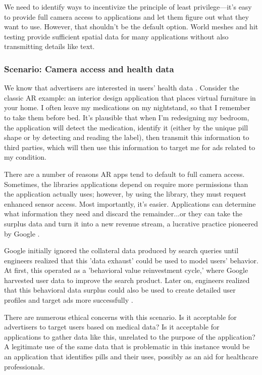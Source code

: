 We need to identify ways to incentivize the principle of least privilege---it's easy to provide full camera access to applications and let them figure out what they want to use. However, that shouldn't be the default option. World meshes and hit testing provide sufficient spatial data for many applications without also transmitting details like text.

\subsubsection{Scenario: Camera access and health data}\label{sec:data:world:camera}

We know that advertisers are interested in users' health data \cite{jeong2019insurers}. Consider the classic AR example: an interior design application that places virtual furniture in your home. I often leave my medications on my nightstand, so that I remember to take them before bed. It's plausible that when I'm redesigning my bedroom, the application will detect the medication, identify it (either by the unique pill shape or by detecting and reading the label), then transmit this information to third parties, which will then use this information to target me for ads related to my condition.

There are a number of reasons AR apps tend to default to full camera access. Sometimes, the libraries applications depend on require more permissions than the application actually uses; however, by using the library, they must request enhanced sensor access. Most importantly, it's easier. Applications can determine what information they need and discard the remainder...or they can take the surplus data and turn it into a new revenue stream, a lucrative practice pioneered by Google \cite{zuboff2019age}.

Google initially ignored the collateral data produced by search queries until engineers realized that this 'data exhaust' could be used to model users' behavior. At first, this operated as a 'behavioral value reinvestment cycle,' where Google harvested user data to improve the search product. Later on, engineers realized that this behavioral data surplus could also be used to create detailed user profiles and target ads more successfully \cite{patent2003targetedad}.

There are numerous ethical concerns with this scenario. Is it acceptable for advertisers to target users based on medical data? Is it acceptable for applications to gather data like this, unrelated to the purpose of the application?  A legitimate use of the same data that is problematic in this instance would be an application that identifies pills and their uses, possibly as an aid for healthcare professionals.

